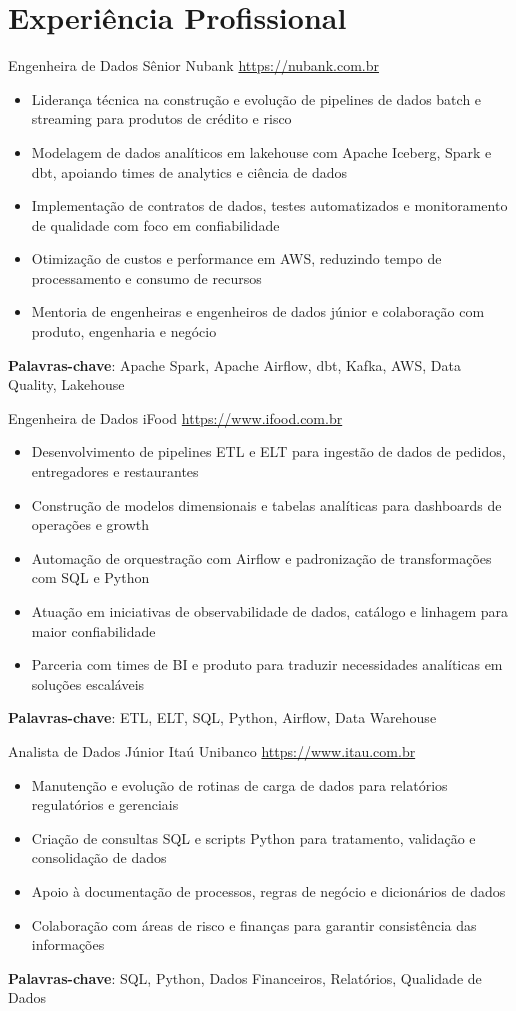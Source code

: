 \documentclass[a4paper, serif, 10pt]{moderncv}
\begin{document}
\section{Experiência Profissional}

        {Engenheira de Dados Sênior}
        {Nubank}
        {\url{https://nubank.com.br}}
        {}
        {\begin{itemize}
\item Liderança técnica na construção e evolução de pipelines de dados batch e streaming para produtos de crédito e risco
\item Modelagem de dados analíticos em lakehouse com Apache Iceberg, Spark e dbt, apoiando times de analytics e ciência de dados
\item Implementação de contratos de dados, testes automatizados e monitoramento de qualidade com foco em confiabilidade
\item Otimização de custos e performance em AWS, reduzindo tempo de processamento e consumo de recursos
\item Mentoria de engenheiras e engenheiros de dados júnior e colaboração com produto, engenharia e negócio
\end{itemize}
\textbf{Palavras-chave}: Apache Spark, Apache Airflow, dbt, Kafka, AWS, Data Quality, Lakehouse}

        {Engenheira de Dados}
        {iFood}
        {\url{https://www.ifood.com.br}}
        {}
        {\begin{itemize}
\item Desenvolvimento de pipelines ETL e ELT para ingestão de dados de pedidos, entregadores e restaurantes
\item Construção de modelos dimensionais e tabelas analíticas para dashboards de operações e growth
\item Automação de orquestração com Airflow e padronização de transformações com SQL e Python
\item Atuação em iniciativas de observabilidade de dados, catálogo e linhagem para maior confiabilidade
\item Parceria com times de BI e produto para traduzir necessidades analíticas em soluções escaláveis
\end{itemize}
\textbf{Palavras-chave}: ETL, ELT, SQL, Python, Airflow, Data Warehouse}

        {Analista de Dados Júnior}
        {Itaú Unibanco}
        {\url{https://www.itau.com.br}}
        {}
        {\begin{itemize}
\item Manutenção e evolução de rotinas de carga de dados para relatórios regulatórios e gerenciais
\item Criação de consultas SQL e scripts Python para tratamento, validação e consolidação de dados
\item Apoio à documentação de processos, regras de negócio e dicionários de dados
\item Colaboração com áreas de risco e finanças para garantir consistência das informações
\end{itemize}
\textbf{Palavras-chave}: SQL, Python, Dados Financeiros, Relatórios, Qualidade de Dados}
\end{document}
